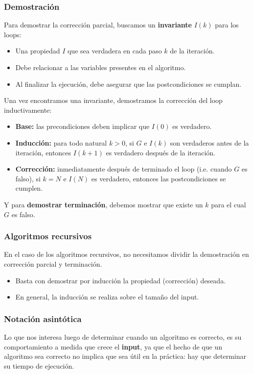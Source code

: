 \begin{multicols}{2}
    \subsubsection*{Demostración}
    Para demostrar la corrección parcial, buscamos un \textbf{invariante} $I(k)$ para los loops:
    \begin{itemize}
        \item Una propiedad $I$ que sea verdadera en cada paso $k$ de la iteración.
        \item Debe relacionar a las variables presentes en el algoritmo.
        \item Al finalizar la ejecución, debe asegurar que las postcondiciones se cumplan.
    \end{itemize}
    
    Una vez encontramos una invariante, demostramos la corrección del loop inductivamente:
    \begin{itemize}
        \item \textbf{Base:} las precondiciones deben implicar que $I(0)$ es verdadero.
        \item \textbf{Inducción:} para todo natural $k > 0$, si $G$ e $I(k)$ son verdaderos antes de la iteración, entonces $I(k + 1)$ es verdadero después de la iteración.
        \item \textbf{Corrección:} inmediatamente después de terminado el loop (i.e. cuando $G$ es falso), si $k = N$ e $I(N)$ es verdadero, entonces las postcondiciones se cumplen.
    \end{itemize}
    
    Y para \textbf{demostrar terminación}, debemos mostrar que existe un $k$ para el cual $G$ es falso.
    
    \subsubsection*{Algoritmos recursivos}
    En el caso de los algoritmos recursivos, no necesitamos dividir la demostración en corrección parcial y terminación.
    \begin{itemize}
        \item Basta con demostrar por inducción la propiedad (corrección) deseada.
        \item En general, la inducción se realiza sobre el tamaño del input.
    \end{itemize}
    
    \subsubsection*{Notación asintótica}
    Lo que nos interesa luego de determinar cuando un algoritmo es correcto, es su comportamiento a medida que crece el \textbf{input}, ya que el hecho de que un algoritmo sea correcto no implica que sea útil en la práctica: hay que determinar su tiempo de ejecución. \p
    

\end{multicols}
